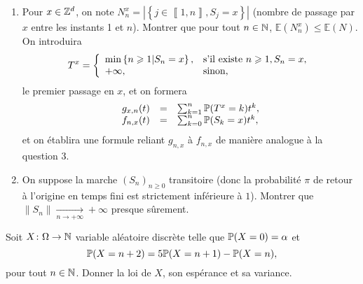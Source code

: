 \documentclass[12pt]{article}
\begin{document}
\begin{exercise}
\begin{enumerate}
        \item Pour $x\in\Z^{d}$, on note $N_n^{x}=\left\lvert\left\lbrace j\in\left\llbracket1,n\right\rrbracket, S_j=x\right\rbrace\right\rvert$ (nombre de passage par $x$ entre les instants 1 et $n$). Montrer que pour tout $n\in\N$, $\mathbb{E}(N_n^{x})\leqslant\mathbb{E}(N)$. On introduira 
        \begin{equation}
            T^{x}=
            \left\lbrace
                \begin{array}[]{ll}
                    \min\left\lbrace n\geqslant 1\middle| S_n=x\right\rbrace, &\text{s'il existe }n\geqslant1, S_n=x,\\
                    +\infty, &\text{sinon,}
                \end{array}
            \right.
        \end{equation}
        le premier passage en $x$, et on formera 
        \begin{equation}
            \begin{array}[]{rcl}
                g_{x,n}(t) &=& \sum_{k=1}^{n}\P(T^{x}=k)t^{k},\\
                f_{n,x}(t) &=& \sum_{k=0}^{n}\P(S_{k}=x)t^{k},
            \end{array}
        \end{equation}
        et on établira une formule reliant $g_{n,x}$ à $f_{n,x}$ de manière analogue à la question 3.

        \item On suppose la marche $(S_n)_{n\geqslant0}$ transitoire (donc la probabilité $\pi$ de retour à l'origine en temps fini est strictement inférieure à $1$). Montrer que $\left\lVert S_n\right\rVert\xrightarrow[n\to+\infty]{}+\infty$ presque sûrement.
    \end{enumerate}
\end{exercise}

\begin{exercise}
    Soit $X\colon\Omega\to\N$ variable aléatoire discrète telle que $\P(X=0)=\alpha$ et 
    \begin{equation*}
        \P(X=n+2)=5\P(X=n+1)-\P(X=n),
    \end{equation*}
    pour tout $n\in\N$. Donner la loi de $X$, son espérance et sa variance. 
\end{exercise}
\end{document}
